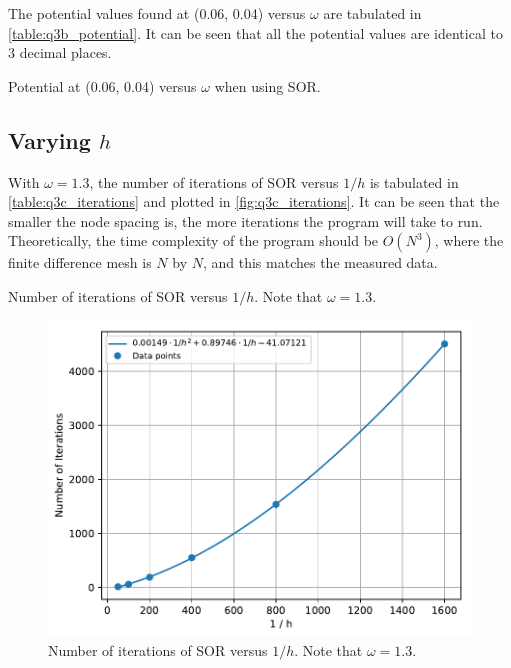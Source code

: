 \documentclass[a4paper,titlepage]{article}
\begin{document}
	The potential values found at (0.06, 0.04) versus $\omega$ are tabulated in \autoref{table:q3b_potential}. It can be seen that all the potential values are identical to 3 decimal places.

	\begin{table}[!htb]
		\centering
		\caption{Potential at (0.06, 0.04) versus $\omega$ when using SOR.}
		\label{table:q3b_potential}
	\end{table}
	
	\subsection{Varying $h$}
	
	With $\omega = 1.3$, the number of iterations of SOR versus $1/h$ is tabulated in \autoref{table:q3c_iterations} and plotted in \autoref{fig:q3c_iterations}. It can be seen that the smaller the node spacing is, the more iterations the program will take to run. Theoretically, the time complexity of the program should be $O(N^3)$, where the finite difference mesh is $N$ by $N$, and this matches the measured data.
	
	\begin{table}[!htb]
		\centering
		\caption{Number of iterations of SOR versus $1/h$. Note that $\omega=1.3$.}
		\label{table:q3c_iterations}
	\end{table}
	
	\begin{figure}[!htb]
		\centering
		\includegraphics[width=\columnwidth]{plots/q3c_iterations.pdf}
		\caption
		{Number of iterations of SOR versus $1/h$. Note that $\omega=1.3$.}
		\label{fig:q3c_iterations}
	\end{figure}
\end{document}
